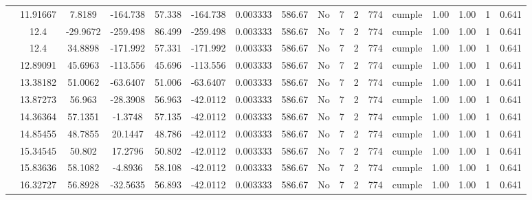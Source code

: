\begin{table}[H]
{\begin{tabular}{|c|c|c|c|c|c|c|c|c|c|c|c|c|c|c|c|c|}
\cline{2-17}    & 11.91667 & 7.8189 & -164.738 & 57.338 & -164.738 & 0.003333 & 586.67 & No  & 7   & 2   & 774 & \cellcolor[rgb]{ .776,  .937,  .808}cumple & 1.00 & 1.00 & 1   & 0.641 \bigstrut\\
\cline{2-17}    & \cellcolor[rgb]{ .851,  .882,  .949}12.4 & -29.9672 & -259.498 & 86.499 & -259.498 & 0.003333 & 586.67 & No  & 7   & 2   & 774 & \cellcolor[rgb]{ .776,  .937,  .808}cumple & 1.00 & 1.00 & 1   & 0.641 \bigstrut\\
\cline{2-17}    & \cellcolor[rgb]{ .851,  .882,  .949}12.4 & 34.8898 & -171.992 & 57.331 & -171.992 & 0.003333 & 586.67 & No  & 7   & 2   & 774 & \cellcolor[rgb]{ .776,  .937,  .808}cumple & 1.00 & 1.00 & 1   & 0.641 \bigstrut\\
\cline{2-17}    & 12.89091 & 45.6963 & -113.556 & 45.696 & -113.556 & 0.003333 & 586.67 & No  & 7   & 2   & 774 & \cellcolor[rgb]{ .776,  .937,  .808}cumple & 1.00 & 1.00 & 1   & 0.641 \bigstrut\\
\cline{2-17}    & 13.38182 & 51.0062 & -63.6407 & 51.006 & -63.6407 & 0.003333 & 586.67 & No  & 7   & 2   & 774 & \cellcolor[rgb]{ .776,  .937,  .808}cumple & 1.00 & 1.00 & 1   & 0.641 \bigstrut\\
\cline{2-17}    & 13.87273 & 56.963 & -28.3908 & 56.963 & -42.0112 & 0.003333 & 586.67 & No  & 7   & 2   & 774 & \cellcolor[rgb]{ .776,  .937,  .808}cumple & 1.00 & 1.00 & 1   & 0.641 \bigstrut\\
\cline{2-17}    & 14.36364 & 57.1351 & -1.3748 & 57.135 & -42.0112 & 0.003333 & 586.67 & No  & 7   & 2   & 774 & \cellcolor[rgb]{ .776,  .937,  .808}cumple & 1.00 & 1.00 & 1   & 0.641 \bigstrut\\
\cline{2-17}    & 14.85455 & 48.7855 & 20.1447 & 48.786 & -42.0112 & 0.003333 & 586.67 & No  & 7   & 2   & 774 & \cellcolor[rgb]{ .776,  .937,  .808}cumple & 1.00 & 1.00 & 1   & 0.641 \bigstrut\\
\cline{2-17}    & 15.34545 & 50.802 & 17.2796 & 50.802 & -42.0112 & 0.003333 & 586.67 & No  & 7   & 2   & 774 & \cellcolor[rgb]{ .776,  .937,  .808}cumple & 1.00 & 1.00 & 1   & 0.641 \bigstrut\\
\cline{2-17}    & 15.83636 & 58.1082 & -4.8936 & 58.108 & -42.0112 & 0.003333 & 586.67 & No  & 7   & 2   & 774 & \cellcolor[rgb]{ .776,  .937,  .808}cumple & 1.00 & 1.00 & 1   & 0.641 \bigstrut\\
\cline{2-17}    & 16.32727 & 56.8928 & -32.5635 & 56.893 & -42.0112 & 0.003333 & 586.67 & No  & 7   & 2   & 774 & \cellcolor[rgb]{ .776,  .937,  .808}cumple & 1.00 & 1.00 & 1   & 0.641 \bigstrut\\

\end{tabular}}
\end{table}
